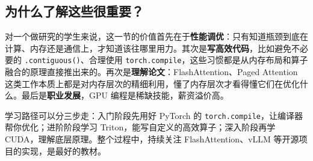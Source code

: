 \subsection*{为什么了解这些很重要？}

对一个做研究的学生来说，这一节的价值首先在于\textbf{性能调优}：只有知道瓶颈到底在计算、内存还是通信上，才知道该往哪里用力。其次是\textbf{写高效代码}，比如避免不必要的 \texttt{.contiguous()}、合理使用 \texttt{torch.compile}，这些习惯都是从内存布局和算子融合的原理直接推出来的。再次是\textbf{理解论文}：FlashAttention、Paged Attention 这类工作本质上都是对内存层次的精细利用，懂了内存层次才看得懂它们在优化什么。最后是\textbf{职业发展}，GPU 编程是稀缺技能，薪资溢价高。

\begin{insightbox}[title=实用建议]
学习路径可以分三步走：入门阶段先用好 PyTorch 的 \texttt{torch.compile}，让编译器帮你优化；进阶阶段学习 Triton，能写自定义的高效算子；深入阶段再学 CUDA，理解底层原理。整个过程中，持续关注 FlashAttention、vLLM 等开源项目的实现，是最好的教材。
\end{insightbox}


